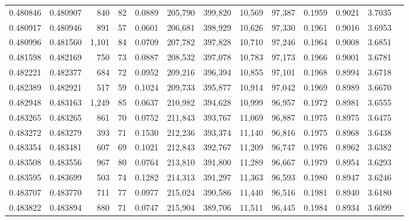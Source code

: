 \begin{tabular}{rrrrrrrrrrrrr}
0.480846 & 0.480907 &   840 &    82 &                                     0.0889 & 205,790 & 399,820 &  10,569 &  97,387 & 0.1959 & 0.9021 & 3.7035 \\
0.480917 & 0.480946 &   891 &    57 &                                     0.0601 & 206,681 & 398,929 &  10,626 &  97,330 & 0.1961 & 0.9016 & 3.6953 \\
0.480996 & 0.481560 & 1,101 &    84 &                                     0.0709 & 207,782 & 397,828 &  10,710 &  97,246 & 0.1964 & 0.9008 & 3.6851 \\
0.481598 & 0.482169 &   750 &    73 &                                     0.0887 & 208,532 & 397,078 &  10,783 &  97,173 & 0.1966 & 0.9001 & 3.6781 \\
0.482221 & 0.482377 &   684 &    72 &                                     0.0952 & 209,216 & 396,394 &  10,855 &  97,101 & 0.1968 & 0.8994 & 3.6718 \\
0.482389 & 0.482921 &   517 &    59 &                                     0.1024 & 209,733 & 395,877 &  10,914 &  97,042 & 0.1969 & 0.8989 & 3.6670 \\
0.482948 & 0.483163 & 1,249 &    85 &                                     0.0637 & 210,982 & 394,628 &  10,999 &  96,957 & 0.1972 & 0.8981 & 3.6555 \\
0.483265 & 0.483265 &   861 &    70 &                                     0.0752 & 211,843 & 393,767 &  11,069 &  96,887 & 0.1975 & 0.8975 & 3.6475 \\
0.483272 & 0.483279 &   393 &    71 &                                     0.1530 & 212,236 & 393,374 &  11,140 &  96,816 & 0.1975 & 0.8968 & 3.6438 \\
0.483354 & 0.483481 &   607 &    69 &                                     0.1021 & 212,843 & 392,767 &  11,209 &  96,747 & 0.1976 & 0.8962 & 3.6382 \\
0.483508 & 0.483556 &   967 &    80 &                                     0.0764 & 213,810 & 391,800 &  11,289 &  96,667 & 0.1979 & 0.8954 & 3.6293 \\
0.483595 & 0.483699 &   503 &    74 &                                     0.1282 & 214,313 & 391,297 &  11,363 &  96,593 & 0.1980 & 0.8947 & 3.6246 \\
0.483707 & 0.483770 &   711 &    77 &                                     0.0977 & 215,024 & 390,586 &  11,440 &  96,516 & 0.1981 & 0.8940 & 3.6180 \\
0.483822 & 0.483894 &   880 &    71 &                                     0.0747 & 215,904 & 389,706 &  11,511 &  96,445 & 0.1984 & 0.8934 & 3.6099 \\

\end{tabular}

